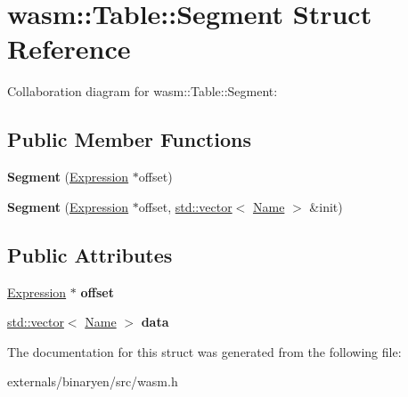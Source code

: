 \hypertarget{structwasm_1_1_table_1_1_segment}{}\section{wasm\+:\+:Table\+:\+:Segment Struct Reference}
\label{structwasm_1_1_table_1_1_segment}


Collaboration diagram for wasm\+:\+:Table\+:\+:Segment\+:
\subsection*{Public Member Functions}
\begin{DoxyCompactItemize}
\item 
\mbox{\label{structwasm_1_1_table_1_1_segment_aa8da1b6c2f8b9dfcd6f8bbf4174b9407}} 
{\bfseries Segment} (\mbox{\hyperlink{classwasm_1_1_expression}{Expression}} $\ast$offset)
\item 
\mbox{\label{structwasm_1_1_table_1_1_segment_ac9184ceb6e523e108c3a7780d592c8c1}} 
{\bfseries Segment} (\mbox{\hyperlink{classwasm_1_1_expression}{Expression}} $\ast$offset, \mbox{\hyperlink{classstd_1_1vector}{std\+::vector}}$<$ \mbox{\hyperlink{structwasm_1_1_name}{Name}} $>$ \&init)
\end{DoxyCompactItemize}
\subsection*{Public Attributes}
\begin{DoxyCompactItemize}
\item 
\mbox{\label{structwasm_1_1_table_1_1_segment_afc055986cc36044f38d1e44717962a5a}} 
\mbox{\hyperlink{classwasm_1_1_expression}{Expression}} $\ast$ {\bfseries offset}
\item 
\mbox{\label{structwasm_1_1_table_1_1_segment_a00df2b9d1001282766edfce4dfe9447d}} 
\mbox{\hyperlink{classstd_1_1vector}{std\+::vector}}$<$ \mbox{\hyperlink{structwasm_1_1_name}{Name}} $>$ {\bfseries data}
\end{DoxyCompactItemize}


The documentation for this struct was generated from the following file\+:\begin{DoxyCompactItemize}
\item 
externals/binaryen/src/wasm.\+h\end{DoxyCompactItemize}
